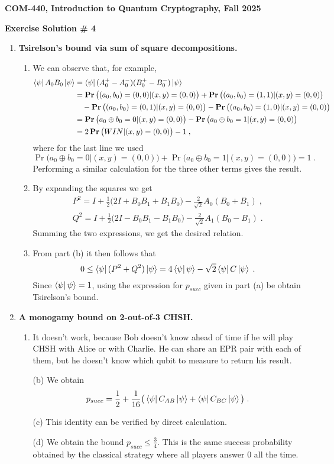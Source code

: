 \documentclass[12pt]{article}
\newcommand{\header}[1]{\begin{center} {\large\bf #1} \end{center}}
\begin{document}
\header{COM-440, Introduction to Quantum Cryptography, Fall 2025}
\header{\bf Exercise Solution \# 4}


\begin{enumerate}

\item \textbf{Tsirelson's bound via sum of square decompositions. }
\begin{enumerate}
\item We can observe that, for example, 
\begin{align*}
\bra{\psi} A_0 B_0 \ket{\psi} &=\bra{\psi} (A_0^+-A_0^-) (B_0^+-B_0^-) \ket{\psi}\\
&= \mathop{\bf Pr\/}\big((a_0,b_0)=(0,0) | (x,y)=(0,0)\big)+\mathop{\bf Pr\/}\big((a_0,b_0)=(1,1) | (x,y)=(0,0)\big)\\
&\quad - \mathop{\bf Pr\/}\big((a_0,b_0)=(0,1) | (x,y)=(0,0)\big)-\mathop{\bf Pr\/}\big((a_0,b_0)=(1,0) | (x,y)=(0,0)\big) \\
&= \mathop{\bf Pr\/}\big(a_0\oplus b_0=0 | (x,y)=(0,0)\big) - \mathop{\bf Pr\/}\big(a_0\oplus b_0=1 | (x,y)=(0,0)\big)\\
&= 2\mathop{\bf Pr\/}\big(WIN| (x,y)=(0,0)\big)-1\;,
\end{align*}
where for the last line we used 
\[ \Pr\big(a_0\oplus b_0=0 | (x,y)=(0,0)\big) + \Pr\big(a_0\oplus b_0=1 | (x,y)=(0,0)\big)= 1 \;.\]
Performing a similar calculation for the three other terms gives the result. 
\item By expanding the squares we get 
\begin{align*}
P^2 = I + \frac{1}{2}\big(2I+B_0B_1+B_1B_0\big) -\frac{2}{\sqrt{2}}A_0(B_0+B_1)\;,\\
Q^2 = I + \frac{1}{2}\big(2I-B_0B_1-B_1B_0\big) -\frac{2}{\sqrt{2}}A_1(B_0-B_1)\;.
\end{align*}
Summing the two expressions, we get the desired relation. 
\item From part (b) it then follows that 
\[ 0\leq \bra{\psi}(P^2+Q^2)\ket{\psi} = 4 \bra{\psi}\psi\rangle - \sqrt{2}\bra{\psi}C\ket{\psi}\;.\]
Since $\bra{\psi}\psi\rangle=1$, using the expression for $p_{succ}$ given in part (a) be obtain Tsirelson's bound. 
\end{enumerate}

\item \textbf{A monogamy bound on 2-out-of-3 CHSH. }
\begin{enumerate}
\item It doesn't work, because Bob doesn't know ahead of time if he will play CHSH with Alice or with Charlie. He can share an EPR pair with each of them, but he doesn't know which qubit to measure to return his result. 
\item[(b)] We obtain 
\[p_{succ} = \frac{1}{2} + \frac{1}{16}\big( \bra{\psi} C_{AB}\ket{\psi} + \bra{\psi} C_{BC}\ket{\psi}\big)\;.\]
\item[(c)] This identity can be verified by direct calculation. 
\item[(d)] We obtain the bound $p_{succ}\leq \frac34$. This is the same success probability obtained by the  classical strategy where all players answer $0$ all the time. 
\end{enumerate}
\end{enumerate}
\end{document}
